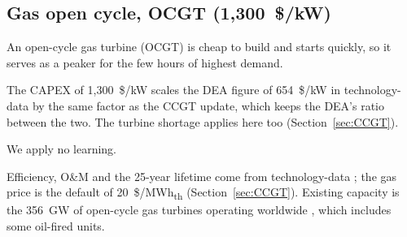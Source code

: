 \subsection{Gas open cycle, OCGT (1,300~\$/kW)}\label{sec:OCGT}
An open-cycle gas turbine (OCGT) is cheap to build and starts quickly, so it serves as a peaker for the few hours of highest demand.

The CAPEX of 1,300~\$/kW scales the DEA figure of 654~\$/kW in technology-data \citep{technologydata} by the same factor as the CCGT update, which keeps the DEA's ratio between the two.
The turbine shortage applies here too (Section~\ref{sec:CCGT}).

We apply no learning.

Efficiency, O\&M and the 25-year lifetime come from technology-data \citep{technologydata}; the gas price is the default of 20~\$/MWh\textsubscript{th} (Section~\ref{sec:CCGT}).
Existing capacity is the 356~GW of open-cycle gas turbines operating worldwide \citep{gemgogpt}, which includes some oil-fired units.
